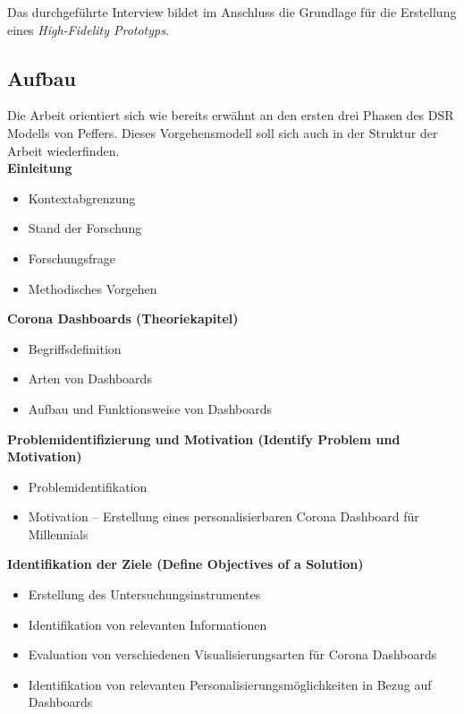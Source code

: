 \documentclass[12pt, oneside]{article}
\begin{document}
Das durchgeführte Interview bildet im Anschluss die Grundlage für die Erstellung eines \textit{High-Fidelity Prototyps}.


\clearpage
\subsection{Aufbau}
Die Arbeit orientiert sich wie bereits erwähnt an den ersten drei Phasen des DSR Modells von Peffers. Dieses Vorgehensmodell soll sich auch in der Struktur der Arbeit wiederfinden.\\

\textbf{Einleitung}
\begin{itemize}
    \item Kontextabgrenzung
    \item Stand der Forschung
    \item Forschungsfrage
    \item Methodisches Vorgehen\\
\end{itemize}

\textbf{Corona Dashboards (Theoriekapitel)}
\begin{itemize}
    \item Begriffsdefinition
    \item Arten von Dashboards
    \item Aufbau und Funktionsweise von Dashboards\\
\end{itemize}


\textbf{Problemidentifizierung und Motivation (Identify Problem und Motivation)}
\begin{itemize}
    \item Problemidentifikation
    \item Motivation – Erstellung eines personalisierbaren Corona Dashboard für Millennials\\
\end{itemize}

\textbf{Identifikation der Ziele (Define Objectives of a Solution)}
\begin{itemize}
    \item Erstellung des Untersuchungsinstrumentes
    \item Identifikation von relevanten Informationen
    \item Evaluation von verschiedenen Visualisierungsarten für Corona Dashboards
    \item Identifikation von relevanten Personalisierungsmöglichkeiten in Bezug auf Dashboards\\
\end{itemize}
\end{document}
